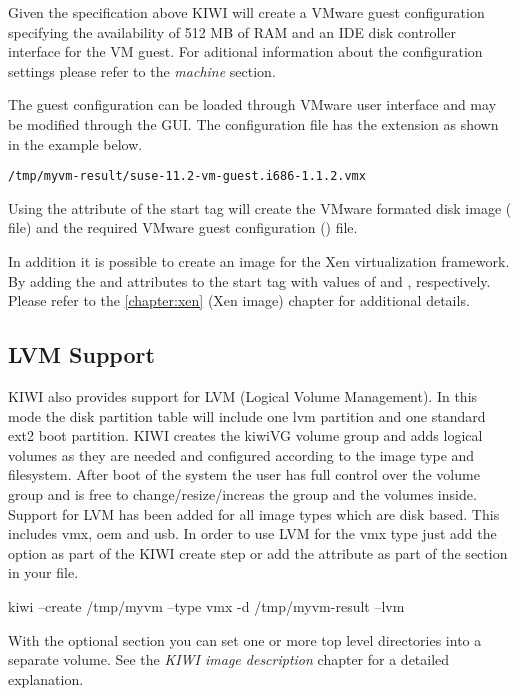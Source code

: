 Given the specification above KIWI will create a VMware guest
configuration specifying the availability of 512 MB of RAM and an IDE 
disk controller interface for the VM guest. For aditional information
about the configuration settings please refer to the 
\textit{machine} section. 

The guest configuration can be loaded through VMware user interface and 
may be modified through the GUI. The configuration file has the  
extension as shown in the example below.

\begin{verbatim}
/tmp/myvm-result/suse-11.2-vm-guest.i686-1.1.2.vmx
\end{verbatim}

Using the  attribute of the  start tag
will create the VMware formated disk image ( file) and the required 
VMware guest configuration () file.

In addition it is possible to create an image for the Xen virtualization 
framework.  By adding the  and  
attributes to the  start tag with values of  and
, 
respectively. Please refer to the \ref{chapter:xen} (Xen image) chapter 
for additional details.

\subsection{LVM Support}
KIWI also provides support for LVM (Logical Volume Management). In this
mode the disk partition table will include one lvm partition and one
standard ext2 boot partition. KIWI creates the kiwiVG volume group and
adds logical volumes as they are needed and configured according to the
image type and filesystem. After boot of the system the user has full
control over the volume group and is free to change/resize/increas the
group and the volumes inside. Support for LVM has been added for all
image types which are disk based. This includes vmx, oem and usb.
In order to use LVM for the vmx type just add the  option
as part of the KIWI create step or add the attribute 
as part of the  section in your  file.

\begin{Command}{12cm}
kiwi --create /tmp/myvm --type vmx -d /tmp/myvm-result --lvm
\end{Command}

With the optional  section you can set one or
more top level directories into a separate volume. See the
\textit{KIWI image description} chapter for a detailed explanation.
